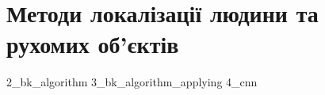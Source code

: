 \section{Методи локалізації людини та рухомих об'єктів}
{2_bk_algorithm}
{3_bk_algorithm_applying}
{4_cnn}
